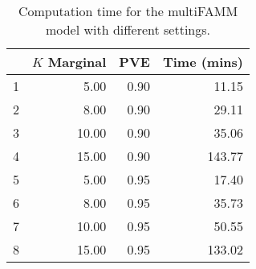 \begin{table}[ht]
\centering
\begin{tabular}{lrrr}
  \toprule
 & {\bfseries $K$ Marginal} & {\bfseries PVE} & {\bfseries Time (mins)} \\ 
  \midrule
1 & 5.00 & 0.90 & 11.15 \\ 
  2 & 8.00 & 0.90 & 29.11 \\ 
  3 & 10.00 & 0.90 & 35.06 \\ 
  4 & 15.00 & 0.90 & 143.77 \\ 
  5 & 5.00 & 0.95 & 17.40 \\ 
  6 & 8.00 & 0.95 & 35.73 \\ 
  7 & 10.00 & 0.95 & 50.55 \\ 
  8 & 15.00 & 0.95 & 133.02 \\ 
   \bottomrule
\end{tabular}
\caption{Computation time for the multiFAMM model with different settings.} 
\label{tab:mfamm-comp-time}
\end{table}
